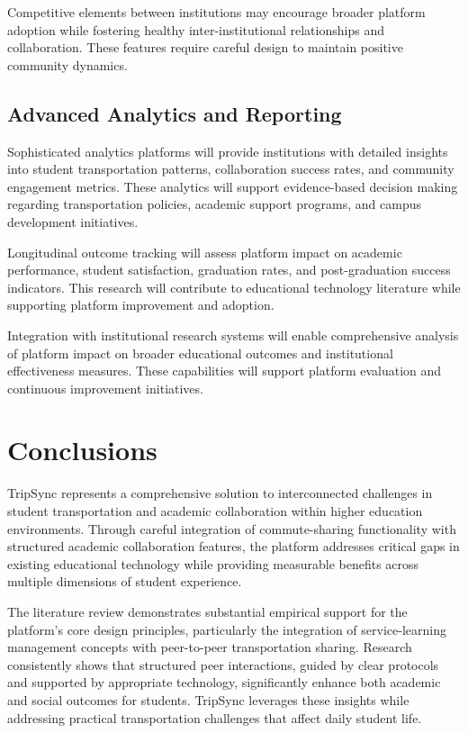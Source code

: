 \documentclass[conference]{IEEEtran}
\begin{document}
Competitive elements between institutions may encourage broader platform adoption while fostering healthy inter-institutional relationships and collaboration. These features require careful design to maintain positive community dynamics.

\subsection{Advanced Analytics and Reporting}

Sophisticated analytics platforms will provide institutions with detailed insights into student transportation patterns, collaboration success rates, and community engagement metrics. These analytics will support evidence-based decision making regarding transportation policies, academic support programs, and campus development initiatives.

Longitudinal outcome tracking will assess platform impact on academic performance, student satisfaction, graduation rates, and post-graduation success indicators. This research will contribute to educational technology literature while supporting platform improvement and adoption.

Integration with institutional research systems will enable comprehensive analysis of platform impact on broader educational outcomes and institutional effectiveness measures. These capabilities will support platform evaluation and continuous improvement initiatives.

\section{Conclusions}

TripSync represents a comprehensive solution to interconnected challenges in student transportation and academic collaboration within higher education environments. Through careful integration of commute-sharing functionality with structured academic collaboration features, the platform addresses critical gaps in existing educational technology while providing measurable benefits across multiple dimensions of student experience.

The literature review demonstrates substantial empirical support for the platform's core design principles, particularly the integration of service-learning management concepts with peer-to-peer transportation sharing. Research consistently shows that structured peer interactions, guided by clear protocols and supported by appropriate technology, significantly enhance both academic and social outcomes for students. TripSync leverages these insights while addressing practical transportation challenges that affect daily student life.
\end{document}
